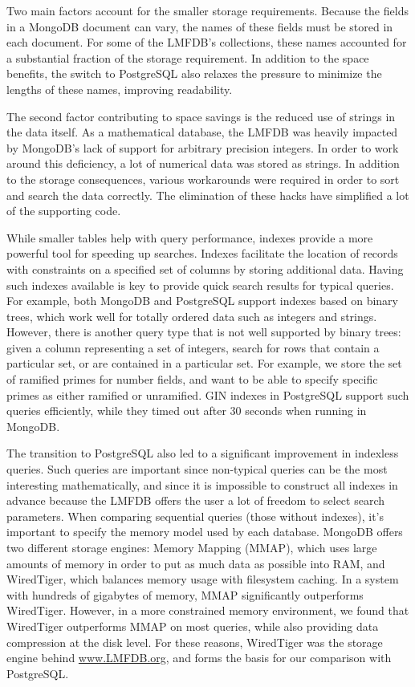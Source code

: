 \documentclass{article}
\begin{document}
Two main factors account for the smaller storage requirements.
Because the fields in a MongoDB document can vary, the names of these fields must be stored in each document.
For some of the LMFDB's collections, these names accounted for a substantial fraction of the storage requirement.
In addition to the space benefits, the switch to PostgreSQL also relaxes the pressure to minimize the lengths of these names, improving readability.

The second factor contributing to space savings is the reduced use of strings in the data itself.
As a mathematical database, the LMFDB was heavily impacted by MongoDB's lack of support for arbitrary precision integers.
In order to work around this deficiency, a lot of numerical data was stored as strings.
In addition to the storage consequences, various workarounds were required in order to sort and search the data correctly.
The elimination of these hacks have simplified a lot of the supporting code.


While smaller tables help with query performance, indexes provide a more powerful tool for speeding up searches.
Indexes facilitate the location of records with constraints on a specified set of columns by storing additional data.
Having such indexes available is key to provide quick search results for typical queries.
For example, both MongoDB and PostgreSQL support indexes based on binary trees, which work well for totally ordered data such as integers and strings. 
However, there is another query type that is not well supported by binary trees: given a column representing a set of integers, search for rows that contain a particular set, or are contained in a particular set.
For example, we store the set of ramified primes for number fields, and want to be able to specify specific primes as either ramified or unramified.
GIN indexes in PostgreSQL support such queries efficiently, while they timed out after 30 seconds when running in MongoDB.


The transition to PostgreSQL also led to a significant improvement in indexless queries.
Such queries are important since non-typical queries can be the most interesting mathematically, and since it is impossible to construct all indexes in advance because the LMFDB offers the user a lot of freedom to select search parameters.
When comparing sequential queries (those without indexes), it's important to specify the memory model used by each database.
MongoDB offers two different storage engines: Memory Mapping (MMAP), which uses large amounts of memory in order to put as much data as possible into RAM, and WiredTiger, which balances memory usage with filesystem caching.
In a system with hundreds of gigabytes of memory, MMAP significantly outperforms WiredTiger.
However, in a more constrained memory environment, we found that WiredTiger outperforms MMAP on most queries, while also providing data compression at the disk level.
For these reasons, WiredTiger was the storage engine behind \url{www.LMFDB.org}, and forms the basis for our comparison with PostgreSQL. 
\end{document}
